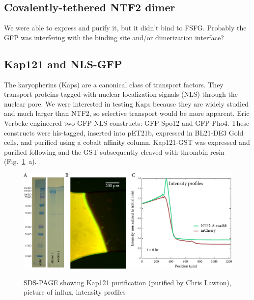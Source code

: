 \subsection{Covalently-tethered NTF2 dimer}

We were able to express and purify it, but it didn't bind to FSFG.  Probably the GFP was interfering with the binding site and/or dimerization interface?  

\subsection{Kap121 and NLS-GFP}
The karyopherins (Kaps) are a canonical class of transport factors.  They transport proteins tagged with nuclear localization signals (NLS) through the nuclear pore.  We were interested in testing Kaps because they are widely studied and much larger than NTF2, so selective transport would be more apparent.  Eric Verbeke engineered two GFP-NLS constructs: GFP-Spo12 and GFP-Pho4.  These constructs were his-tagged, inserted into pET21b, expressed in BL21-DE3 Gold cells, and purified using a cobalt affinity column. 
Kap121-GST was expressed and purified following \cite{tetenbaum-novatt12} and the GST subsequently cleaved with thrombin resin (Fig.~\ref{fig:Kap121}~a).
\begin{figure} %
\caption{SDS-PAGE showing Kap121 purification (purified by Chris Lawton), picture of influx, intensity profiles}
\centering
\includegraphics[width=\textwidth]{figs/ch03/Kap121}
\label{fig:Kap121}
\end{figure} %


